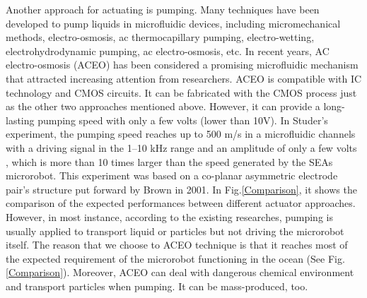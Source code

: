 \documentclass[journal,svgnames,twocolumn,x11names]{IEEEtran}
\begin{document}
Another approach for actuating is pumping. Many techniques have been developed to pump liquids in microfluidic devices, including micromechanical methods\cite{Stone2004}, electro-osmosis\cite{Manz1994}, ac thermocapillary pumping\cite{Kataoka1999}, electro-wetting\cite{Beni1981}, electrohydrodynamic pumping\cite{fuhr1992}, ac electro-osmosis\cite{Brown2000}, etc. In recent years, AC electro-osmosis (ACEO) has been considered a promising microfluidic mechanism that attracted increasing attention from researchers. ACEO is compatible with IC technology\cite{islam2006} and CMOS circuits. It can be fabricated with the CMOS process just as the other two approaches mentioned above. However, it can provide a long-lasting pumping speed with only a few volts (lower than 10V). In Studer’s experiment, the pumping speed reaches up to 500 \textmu m/s in a microfluidic channels with a driving signal in the 1–10 kHz range and an amplitude of only a few volts \cite{Studer2004}, which is more than 10 times larger than the speed generated by the SEAs microrobot. This experiment was based on a co-planar asymmetric electrode pair’s structure put forward by Brown in 2001\cite{Brown2000}. In Fig.\ref{Comparison}, it shows the comparison of the expected performances between different actuator approaches. However, in most instance, according to the existing researches, pumping is usually applied to transport liquid or particles but not driving the microrobot itself. The reason that we choose to ACEO technique is that it reaches most of the expected requirement of the microrobot functioning in the ocean (See Fig.\ref{Comparison}). Moreover, ACEO can deal with dangerous chemical environment and transport particles when pumping. It can be mass-produced, too.
\end{document}
